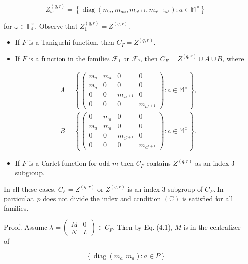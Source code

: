 \documentclass[10pt]{article}
\begin{document}
$$
Z_{\omega}^{(q, r)}=\left\{\operatorname{diag}\left(m_{a}, m_{a \omega}, m_{a^{q+1}}, m_{a^{r+1} \omega^{r}}\right): a \in \mathbb{M}^{\times}\right\}
$$

for $\omega \in \mathbb{F}_{4}^{\times}$. Observe that $Z_{1}^{(q, r)}=Z^{(q, r)}$.

\begin{itemize}
  \item If $F$ is a Taniguchi function, then $C_{F}=Z^{(q, r)}$.
  \item If $F$ is a function in the families $\mathcal{F}_{1}$ or $\mathcal{F}_{2}$, then $C_{F}=Z^{(q, r)} \cup A \cup B$, where
\end{itemize}

$$
\begin{aligned}
& A=\left\{\left(\begin{array}{cccc}
m_{a} & m_{a} & 0 & 0 \\
m_{a} & 0 & 0 & 0 \\
0 & 0 & m_{a^{q+1}} & 0 \\
0 & 0 & 0 & m_{a^{r+1}}
\end{array}\right): a \in \mathbb{M}^{\times}\right\}, \\
& B=\left\{\left(\begin{array}{cccc}
0 & m_{a} & 0 & 0 \\
m_{a} & m_{a} & 0 & 0 \\
0 & 0 & m_{a^{q+1}} & 0 \\
0 & 0 & 0 & m_{a^{r+1}}
\end{array}\right): a \in \mathbb{M}^{\times}\right\} .
\end{aligned}
$$

\begin{itemize}
  \item If $F$ is a Carlet function for odd $m$ then $C_{F}$ contains $Z^{(q, r)}$ as an index 3 subgroup.
\end{itemize}

In all these cases, $C_{F}=Z^{(q, r)}$ or $Z^{(q, r)}$ is an index 3 subgroup of $C_{F}$. In particular, $p$ does not divide the index and condition $(\mathrm{C})$ is satisfied for all families.

Proof. Assume $\lambda=\left(\begin{array}{cc}M & 0 \\ N & L\end{array}\right) \in C_{F}$. Then by Eq. (4.1), $M$ is in the centralizer of

$$
\left\{\operatorname{diag}\left(m_{a}, m_{a}\right): a \in P\right\}
$$
\end{document}
